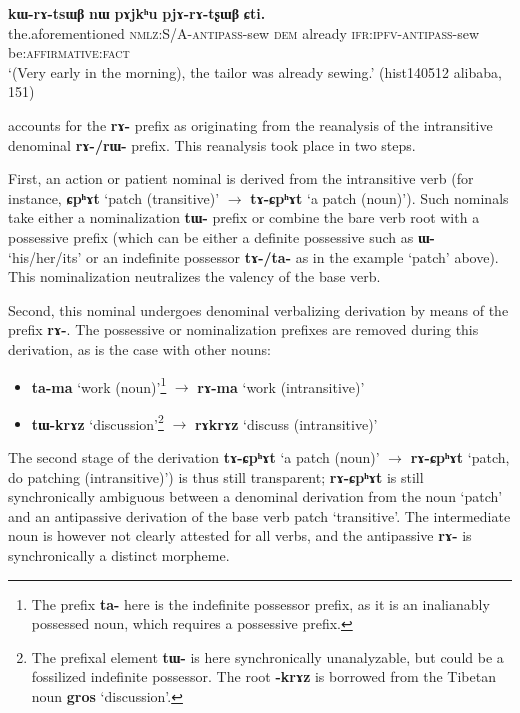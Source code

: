 \documentclass[oneside,a4paper,11pt]{article}
\newcommand{\ipa}[1]{{\phon\textbf{#1}}}
\begin{document}
\begin{exe}
\ex \label{ex:pjArAtsxWB}
\gll \ipa{iɕqʰa}	\ipa{kɯ-rɤ-tsɯβ}	\ipa{nɯ}	\ipa{pɤjkʰu}	\ipa{pjɤ-rɤ-tʂɯβ}	\ipa{ɕti.} \\
the.aforementioned \textsc{nmlz:S/A-antipass}-sew  \textsc{dem} already  \textsc{ifr:ipfv-antipass}-sew be:\textsc{affirmative:fact} \\
\glt `(Very early in the morning), the tailor was already sewing.' (hist140512 alibaba, 151)
\end{exe}

\citet{jacques14antipassive} accounts for the \ipa{rɤ-} prefix as originating from the reanalysis of the intransitive denominal \ipa{rɤ-/rɯ-} prefix. This reanalysis took place in two steps. 

First, an action or patient nominal is derived from the intransitive verb (for instance, \ipa{ɕpʰɤt} `patch (transitive)' $\rightarrow$  \ipa{tɤ-ɕpʰɤt} `a patch (noun)'). Such nominals take either a nominalization \ipa{tɯ-} prefix or combine the bare verb root with a possessive prefix (which can be either a definite possessive such as \ipa{ɯ-} `his/her/its' or an indefinite possessor \ipa{tɤ-/ta-} as in the example `patch' above). This nominalization neutralizes the valency of the base verb.

Second, this nominal undergoes denominal verbalizing derivation by means of the prefix \ipa{rɤ-}. The possessive or nominalization prefixes are removed during this derivation, as is the case with other nouns:
\begin{itemize}
\item \ipa{ta-ma} `work (noun)'\footnote{The prefix \ipa{ta-} here is the indefinite possessor prefix, as it is an inalianably possessed noun, which requires a possessive prefix. }  $\rightarrow$  \ipa{rɤ-ma} `work (intransitive)'
\item \ipa{tɯ-krɤz} `discussion'\footnote{The prefixal element \ipa{tɯ-} is here synchronically unanalyzable, but could be a fossilized indefinite possessor. The root \ipa{-krɤz} is borrowed from the Tibetan noun \ipa{gros} `discussion'. } $\rightarrow$ \ipa{rɤkrɤz} `discuss (intransitive)'
\end{itemize}

The second stage of the derivation \ipa{tɤ-ɕpʰɤt} `a patch (noun)' $\rightarrow$ \ipa{rɤ-ɕpʰɤt} `patch, do patching (intransitive)') is thus still transparent; \ipa{rɤ-ɕpʰɤt} is still synchronically ambiguous between a denominal derivation from the noun `patch' and an antipassive derivation of the base verb  patch `transitive'. The intermediate noun is however not clearly attested for all verbs, and the antipassive \ipa{rɤ-} is synchronically a distinct morpheme.
\end{document}
